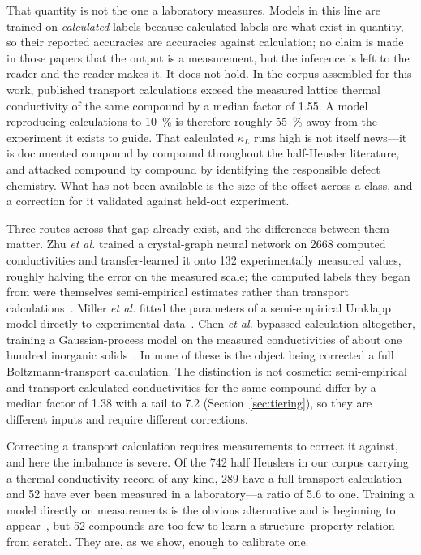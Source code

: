That quantity is not the one a laboratory measures. Models in this line are trained on
\emph{calculated} labels because calculated labels are what exist in quantity, so their reported
accuracies are accuracies against calculation; no claim is made in those papers that the output is
a measurement, but the inference is left to the reader and the reader makes it. It does not hold.
In the corpus assembled for this work, published transport calculations exceed the measured lattice
thermal conductivity of the same compound by a median factor of \num{1.55}. A model reproducing
calculations to \SI{10}{\percent} is therefore roughly \SI{55}{\percent} away from the experiment it
exists to guide. That calculated $\kappa_L$ runs high is not itself news---it is documented compound
by compound throughout the half-Heusler literature, and attacked compound by compound by
identifying the responsible defect chemistry. What has not been available is the size of the offset
across a class, and a correction for it validated against held-out experiment.

Three routes across that gap already exist, and the differences between them matter. Zhu
\emph{et al.} trained a crystal-graph neural network on \num{2668} computed conductivities and
transfer-learned it onto \num{132} experimentally measured values, roughly halving the error on the
measured scale; the computed labels they began from were themselves semi-empirical estimates rather
than transport calculations~\cite{zhu2021charting}. Miller \emph{et al.} fitted the parameters of a
semi-empirical Umklapp model directly to experimental data~\cite{miller2017capturing}. Chen
\emph{et al.} bypassed calculation altogether, training a Gaussian-process model on the measured
conductivities of about one hundred inorganic solids~\cite{chen2019machine}. In none of these is the
object being corrected a full Boltzmann-transport calculation. The distinction is not cosmetic:
semi-empirical and transport-calculated conductivities for the same compound differ by a median
factor of \num{1.38} with a tail to \num{7.2} (Section~\ref{sec:tiering}), so they are different
inputs and require different corrections.

Correcting a transport calculation requires measurements to correct it against, and here the
imbalance is severe. Of the \num{742} half Heuslers in our corpus carrying a thermal conductivity
record of any kind, \num{289} have a full transport calculation and \num{52} have ever been measured
in a laboratory---a ratio of \num{5.6} to one. Training a model directly on measurements is the
obvious alternative and is beginning to appear~\cite{barua2024interpreta}, but \num{52} compounds
are too few to learn a structure--property relation from scratch. They are, as we show, enough to
calibrate one.

